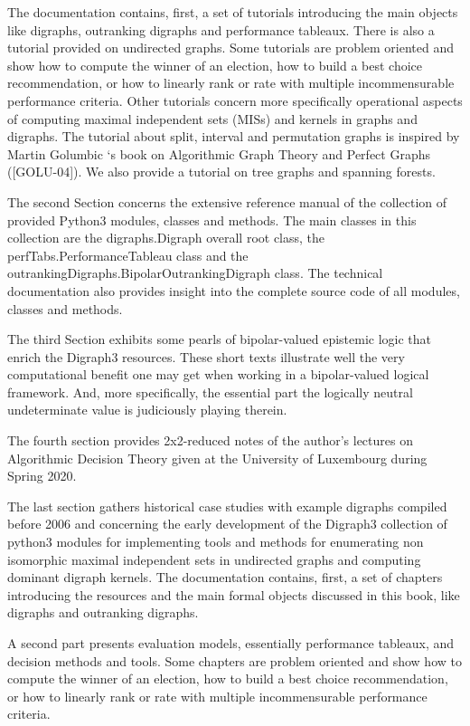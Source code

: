 The documentation contains, first, a set of tutorials introducing the main objects like digraphs, outranking digraphs and performance tableaux. There is also a tutorial provided on undirected graphs. Some tutorials are problem oriented and show how to compute the winner of an election, how to build a best choice recommendation, or how to linearly rank or rate with multiple incommensurable performance criteria. Other tutorials concern more specifically operational aspects of computing maximal independent sets (MISs) and kernels in graphs and digraphs. The tutorial about split, interval and permutation graphs is inspired by Martin Golumbic ‘s book on Algorithmic Graph Theory and Perfect Graphs ([GOLU-04]). We also provide a tutorial on tree graphs and spanning forests.

The second Section concerns the extensive reference manual of the collection of provided Python3 modules, classes and methods. The main classes in this collection are the digraphs.Digraph overall root class, the perfTabs.PerformanceTableau class and the outrankingDigraphs.BipolarOutrankingDigraph class. The technical documentation also provides insight into the complete source code of all modules, classes and methods.

The third Section exhibits some pearls of bipolar-valued epistemic logic that enrich the Digraph3 resources. These short texts illustrate well the very computational benefit one may get when working in a bipolar-valued logical framework. And, more specifically, the essential part the logically neutral undeterminate value is judiciously playing therein.

The fourth section provides 2x2-reduced notes of the author’s lectures on Algorithmic Decision Theory given at the University of Luxembourg during Spring 2020.

The last section gathers historical case studies with example digraphs compiled before 2006 and concerning the early development of the Digraph3 collection of python3 modules for implementing tools and methods for enumerating non isomorphic maximal independent sets in undirected graphs and computing dominant digraph kernels.
The documentation contains, first, a set of chapters introducing the \Digraph resources and the main formal objects discussed in this book, like digraphs and outranking digraphs.

A second part presents evaluation models, essentially performance tableaux, and decision methods and tools. Some chapters are problem oriented and show how to compute the winner of an election, how to build a best choice recommendation, or how to linearly rank or rate with multiple incommensurable performance criteria.

